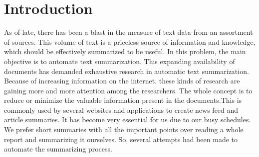 \chapter{Introduction}
\thispagestyle{empty}
As of late, there has been a blast in the measure of text data from an assortment of sources. This volume of text is a priceless source of information and knowledge, which should be effectively summarized to be useful. In this problem, the main objective is to automate text summarization. This expanding availability of documents has demanded exhaustive research in automatic text summarization. Because of increasing information on the internet, these kinds of research are gaining more and more attention among the researchers. The whole concept is to reduce or minimize the valuable information present in the documents.This is commonly used by several websites and applications to create news feed and article summaries. It has become very essential for us due to our busy schedules. We prefer short summaries with all the important points over reading a whole report and summarizing it ourselves. So, several attempts had been made to automate the summarizing process.
\\








